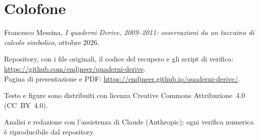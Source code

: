 \section*{Colofone}

\begin{small}
\noindent Francesco Messina, \emph{I quaderni Derive, 2009--2011:
osservazioni da un taccuino di calcolo simbolico}, ottobre 2026.

\smallskip\noindent
Repository, con i file originali, il codice del recupero e gli script di
verifica: \url{https://github.com/endjneer/quaderni-derive}.\\
Pagina di presentazione e PDF:
\url{https://endjneer.github.io/quaderni-derive/}.

\smallskip\noindent
Testo e figure sono distribuiti con licenza Creative Commons Attribuzione~4.0
(CC~BY~4.0).

\smallskip\noindent
Analisi e redazione con l'assistenza di Claude (Anthropic); ogni verifica
numerica è riproducibile dal repository.
\end{small}
